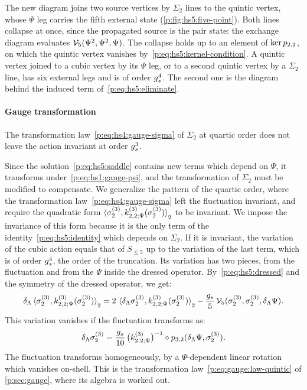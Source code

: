 The new diagram joins two source vertices by $\Sigma_2$ lines to the quintic vertex, whose $\Psi$ leg carries the fifth external state (\cref{p:fig:hs5:five-point}).
Both lines collapse at once, since the propagated source is the pair state: the exchange diagram evaluates $\mathcal{V}_{5}(\Psi^2, \Psi^2, \Psi)$.
The collapse holds up to an element of $\ker p_{2,2}$, on which the quintic vertex vanishes by~\eqref{p:eq:hs5:kernel-condition}.
A quintic vertex joined to a cubic vertex by its $\Psi$ leg, or to a second quintic vertex by a $\Sigma_2$ line, has six external legs and is of order $g_s^4$.
The second one is the diagram behind the induced term of~\eqref{p:eq:hs5:eliminate}.


\paragraph{Gauge transformation}

The transformation law~\eqref{p:eq:hs4:gauge-sigma} of $\Sigma_2$ at quartic order does not leave the action invariant at order $g_s^3$.

Since the solution~\eqref{p:eq:hs5:saddle} contains new terms which depend on $\Psi$, it transforms under~\eqref{p:eq:hs1:gauge-psi}, and the transformation of $\Sigma_2$ must be modified to compensate.
We generalize the pattern of the quartic order, where the transformation law~\eqref{p:eq:hs4:gauge-sigma} left the fluctuation invariant, and require the quadratic form $\pair[2]{\sigma_2^{(3)}}{\kin{2}{\Psi}{3}(\sigma_2^{(3)})}$ to be invariant.
We impose the invariance of this form because it is the only term of the identity~\eqref{p:eq:hs5:identity} which depends on $\Sigma_2$.
If it is invariant, the variation of the cubic action equals that of $S_{\le 5}$ up to the variation of the last term, which is of order $g_s^4$, the order of the truncation.
Its variation has two pieces, from the fluctuation and from the $\Psi$ inside the dressed operator.
By~\eqref{p:eq:hs5:dressed} and the symmetry of the dressed operator, we get:
\begin{equation}
  \label{p:eq:hs5:form-variation}
  \delta_\Lambda \pair[2]{\sigma_2^{(3)}}{\kin{2}{\Psi}{3}(\sigma_2^{(3)})}
    = 2 \, \pair[2]{\delta_\Lambda \sigma_2^{(3)}}{\kin{2}{\Psi}{3}(\sigma_2^{(3)})}
      - \frac{\gs}{5} \, \vertex{5}(\sigma_2^{(3)}, \sigma_2^{(3)}, \delta_\Lambda \Psi).
\end{equation}
This variation vanishes if the fluctuation transforms as:
\begin{equation}
  \label{p:eq:hs5:gauge-deviation}
  \delta_\Lambda \sigma_2^{(3)}
    = \frac{\gs}{10} \, \big( \kin{2}{\Psi}{3} \big)^{-1} \circ \sprod{3}{2}(\delta_\Lambda \Psi, \sigma_2^{(3)}).
\end{equation}
The fluctuation transforms homogeneously, by a $\Psi$-dependent linear rotation which vanishes on-shell.
This is the transformation law~\eqref{p:eq:gauge:law-quintic} of \cref{p:sec:gauge}, where its algebra is worked out.

